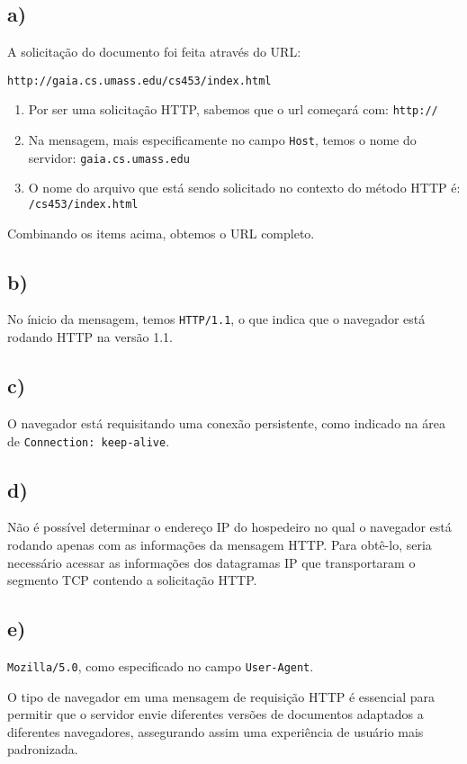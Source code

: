 \documentclass{homework}
\begin{document}
\begin{exercise}[P4)]
\subsection*{a)}
A solicitação do documento foi feita através do URL: 
\begin{center}
\texttt{http://gaia.cs.umass.edu/cs453/index.html}    
\end{center}

\begin{enumerate}
    \item Por ser uma solicitação HTTP, sabemos que o url começará com:  \texttt{http://}
    \item Na mensagem, mais especificamente no campo \texttt{Host}, temos o nome do servidor: \texttt{gaia.cs.umass.edu}
    \item O nome do arquivo que está sendo solicitado no contexto do método HTTP é: \texttt{/cs453/index.html}
\end{enumerate}

Combinando os items acima, obtemos o URL completo.
\subsection*{b)}
No ínicio da mensagem, temos \texttt{HTTP/1.1}, o que indica que o navegador está rodando HTTP na versão 1.1.
\subsection*{c)}
O navegador está requisitando uma conexão persistente, como indicado na área de \texttt{Connection: keep-alive}. 
\subsection*{d)}
Não é possível determinar o endereço IP do hospedeiro no qual o navegador está rodando apenas com as informações da mensagem HTTP. Para obtê-lo, seria necessário acessar as informações dos datagramas IP que transportaram o segmento TCP contendo a solicitação HTTP.
\subsection*{e)}
\texttt{Mozilla/5.0}, como especificado no campo \texttt{User-Agent}.

O tipo de navegador em uma mensagem de requisição HTTP é essencial para permitir que o servidor envie diferentes versões de documentos adaptados a diferentes navegadores, assegurando assim uma experiência de usuário mais padronizada.
\end{exercise}
\end{document}
